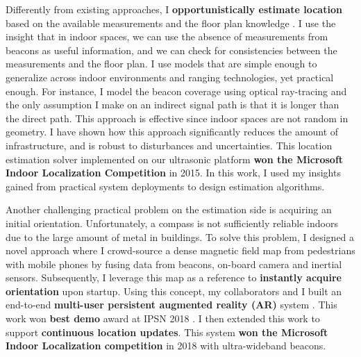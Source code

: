 \documentclass[10pt]{article}
\begin{document}
Differently from existing approaches, I \textbf{opportunistically estimate location} based on the available measurements and the floor plan knowledge \cite{rajagopal2018enhancing}. I use the insight that in indoor spaces, we can use the absence of measurements from beacons as useful information, and we can check for consistencies between the measurements and the floor plan. I use models that are simple enough to generalize across indoor environments and ranging technologies, yet practical enough. For instance, I model the beacon coverage using optical ray-tracing and the only assumption I make on an indirect  signal path is that it is longer than the direct path. This approach is effective since indoor spaces are not random in geometry.  %
I have shown how this approach significantly reduces the amount of infrastructure, and is robust to %
disturbances and uncertainties. %
This location estimation solver implemented on our ultrasonic platform \textbf{won the Microsoft Indoor Localization Competition} in 2015. In this work, I used my insights gained from practical system deployments to design estimation algorithms.%

Another challenging practical problem on the estimation side is acquiring an initial orientation. Unfortunately, a compass is not sufficiently reliable indoors due to the large amount of metal in buildings. 
To solve this problem, I designed a novel approach where I crowd-source a dense magnetic field map from pedestrians with mobile phones by fusing data from beacons, on-board camera and inertial sensors. Subsequently, I leverage this map as a reference to \textbf{instantly acquire orientation} upon startup. 
Using this concept, my collaborators and I built an end-to-end \textbf{multi-user persistent augmented reality (AR)} system \cite{mobileAR}. This work won \textbf{best demo} award at IPSN 2018 \cite{rajagopal2018welcome}. I then extended this work to support \textbf{continuous location updates}. This system \textbf{won the Microsoft Indoor Localization competition} in 2018 with ultra-wideband beacons.  
\end{document}
